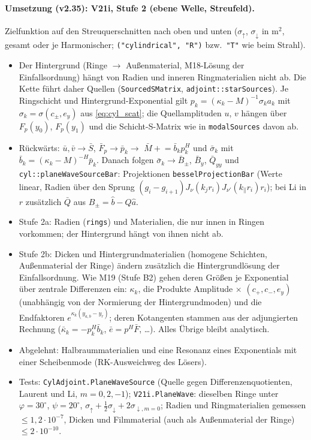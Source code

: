 \paragraph{Umsetzung (v2.35): V21i, Stufe 2 (ebene Welle, Streufeld).}
Zielfunktion auf den Streuquerschnitten nach oben und unten ($\sigma_\uparrow$, $\sigma_\downarrow$ in \textmu m$^2$, gesamt
oder je Harmonischer; \verb|("cylindrical", "R")| bzw.\ \verb|"T"| wie beim Strahl).
\begin{itemize}[nosep]
  \item Der Hintergrund (Ringe $\to$ Außenmaterial, M18-Lösung der Einfallsordnung) hängt von Radien und inneren
        Ringmaterialien nicht ab. Die Kette führt daher Quellen (\verb|SourcedSMatrix|, \verb|adjoint::starSources|).
        Je Ringschicht und Hintergrund-Exponential gilt $p_k=(\kappa_k-M)^{-1}\sigma_ka_k$ mit
        $\sigma_k=\sigma(c_\pm,e_y)$ aus \eqref{eq:cyl_scat}; die Quellamplituden $u$, $v$ hängen über $F_p(y_0)$,
        $F_p(y_1)$ und die Schicht-S-Matrix wie in \verb|modalSources| davon ab.
  \item Rückwärts: $\bar u,\bar v\to\bar S$, $\bar F_p\to\bar p_k\to$ $\bar M\mathrel{+}=\bar b_kp_k^H$ und
        $\bar\sigma_k$ mit $\bar b_k=(\kappa_k-M)^{-H}\bar p_k$. Danach folgen $\bar\sigma_k\to\bar B_{\pm}$, $\bar B_y$, $\bar Q_{yy}$
        und \verb|cyl::planeWaveSourceBar|: Projektionen \verb|besselProjectionBar| (Werte linear, Radien über den
        Sprung $(g_i-g_{i+1})J_\nu(k_jr_i)J_{\nu'}(k_\parallel r_i)r_i$); bei Li in $r$ zusätzlich $\bar Q$ aus
        $B_{\pm}=\hat b-Q\hat a$.
  \item Stufe 2a: Radien (\verb|rings|) und Materialien, die nur innen in Ringen vorkommen; der Hintergrund hängt von
        ihnen nicht ab.
  \item Stufe 2b: Dicken und Hintergrundmaterialien (homogene Schichten, Außenmaterial der Ringe) ändern zusätzlich die
        Hintergrundlösung der Einfallsordnung. Wie M19 (Stufe B2) gehen deren Größen je Exponential über zentrale
        Differenzen ein: $\kappa_k$, die Produkte Amplitude $\times$ $(c_+,c_-,e_y)$ (unabhängig von der Normierung der
        Hintergrundmoden) und die Endfaktoren $e^{\kappa_k(y_{a,b}-y_r)}$; deren Kotangenten stammen aus der adjungierten
        Rechnung ($\bar\kappa_k=-p_k^H\bar b_k$, $\bar e=p^H\bar F$, \dots). Alles Übrige bleibt analytisch.
  \item Abgelehnt: Halbraummaterialien und eine Resonanz eines Exponentials mit einer Scheibenmode (RK-Ausweichweg des
        Lösers).
  \item Tests: \verb|CylAdjoint.PlaneWaveSource| (Quelle gegen Differenzenquotienten, Laurent und Li, $m=0,2,-1$);
        \verb|V21i.PlaneWave|: dieselben Ringe unter $\varphi=30^\circ$, $\psi=20^\circ$,
        $\sigma_\uparrow+\tfrac12\sigma_\downarrow+2\sigma_{\downarrow,m=0}$; Radien und Ringmaterialien gemessen
        $\le1{,}2\cdot10^{-7}$, Dicken und Filmmaterial (auch als Außenmaterial der Ringe) $\le2\cdot10^{-10}$.
\end{itemize}

